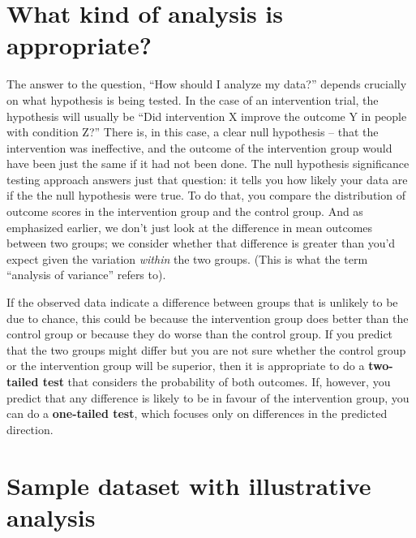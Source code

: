 \documentclass{krantz}
\begin{document}
\hypertarget{what-kind-of-analysis-is-appropriate}{%
\section{What kind of analysis is appropriate?}\label{what-kind-of-analysis-is-appropriate}}

The answer to the question, ``How should I analyze my data?'' depends crucially on what hypothesis is being tested. In the case of an intervention trial, the hypothesis will usually be ``Did intervention X improve the outcome Y in people with condition Z?'' There is, in this case, a clear null hypothesis -- that the intervention was ineffective, and the outcome of the intervention group would have been just the same if it had not been done. The null hypothesis significance testing approach answers just that question: it tells you how likely your data are if the the null hypothesis were true. To do that, you compare the distribution of outcome scores in the intervention group and the control group. And as emphasized earlier, we don't just look at the difference in mean outcomes between two groups; we consider whether that difference is greater than you'd expect given the variation \emph{within} the two groups. (This is what the term ``analysis of variance'' refers to).

If the observed data indicate a difference between groups that is unlikely to be due to chance, this could be because the intervention group does better than the control group or because they do worse than the control group. If you predict that the two groups might differ but you are not sure whether the control group or the intervention group will be superior, then it is appropriate to do a \textbf{two-tailed test} that considers the probability of both outcomes. If, however, you predict that any difference is likely to be in favour of the intervention group, you can do a \textbf{one-tailed test}, which focuses only on differences in the predicted direction.

\hypertarget{sample-dataset-with-illustrative-analysis}{%
\section{Sample dataset with illustrative analysis}\label{sample-dataset-with-illustrative-analysis}}
\end{document}
